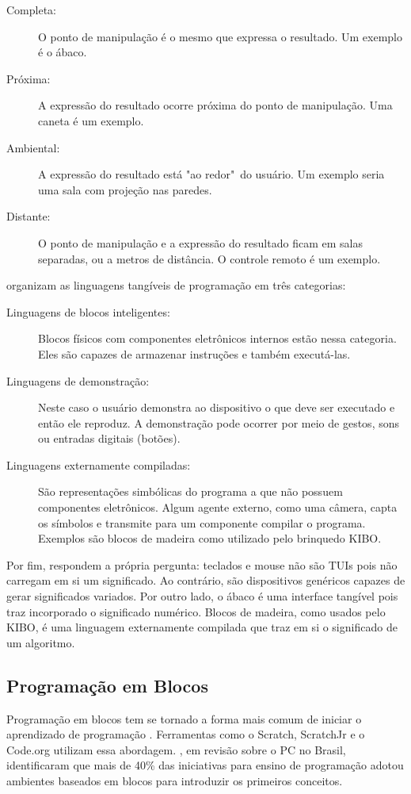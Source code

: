 \begin{description}
    \item[Completa:] O ponto de manipulação é o mesmo que expressa o resultado. Um exemplo é o ábaco.
    \item[Próxima:] A expressão do resultado ocorre próxima do ponto de manipulação. Uma caneta é um exemplo.
    \item[Ambiental:] A expressão do resultado está "ao redor"\ do usuário. Um exemplo seria uma sala com projeção nas paredes.
    \item[Distante:] O ponto de manipulação e a expressão do resultado ficam em salas separadas, ou a metros de distância. O controle remoto é um exemplo.
\end{description}

 organizam as linguagens tangíveis de programação em três categorias:

\begin{description}
    \item[Linguagens de blocos inteligentes:] Blocos físicos com componentes eletrônicos internos estão nessa categoria. Eles são capazes de armazenar instruções e também executá-las.
    
    \item[Linguagens de demonstração:] Neste caso o usuário demonstra ao dispositivo o que deve ser executado e então ele reproduz. A demonstração pode ocorrer por meio de gestos, sons ou entradas digitais (botões).
    
    \item[Linguagens externamente compiladas:] São representações simbólicas do programa a que não possuem componentes eletrônicos. Algum agente externo, como uma câmera, capta os símbolos e transmite para um componente compilar o programa. Exemplos são blocos de madeira como utilizado pelo brinquedo KIBO.
\end{description}

Por fim,  respondem a própria pergunta: teclados e mouse não são TUIs pois não carregam em si um significado. Ao contrário, são dispositivos genéricos capazes de gerar significados variados. Por outro lado, o ábaco é uma interface tangível pois traz incorporado o significado numérico. Blocos de madeira, como usados pelo KIBO, é uma linguagem externamente compilada que traz em si o significado de um algoritmo.

\subsection{Programação em Blocos}
\label{sec_prog_blocos}
Programação em blocos tem se tornado a forma mais comum de iniciar o aprendizado de programação \cite{weintrop_block-based_2019}. Ferramentas como o Scratch, ScratchJr e o Code.org utilizam essa abordagem. , em revisão sobre o \acl{PC} no Brasil, identificaram que mais de 40\% das iniciativas para ensino de programação adotou ambientes baseados em blocos para introduzir os primeiros conceitos. 

